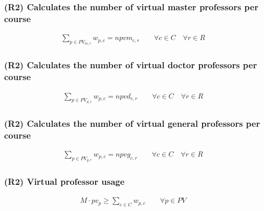 \subsubsection{(R2) Calculates the number of virtual master professors per course}
\begin{eqnarray}
\sum\limits_{p \in PV_{m,r}} w_{p,c} = npvm_{c,r} \nonumber \qquad 
\forall c \in C \quad
\forall r \in R
\end{eqnarray}

\subsubsection{(R2) Calculates the number of virtual doctor professors per course}
\begin{eqnarray}
\sum\limits_{p \in PV_{d,r}} w_{p,c} = npvd_{c,r} \nonumber \qquad 
\forall c \in C \quad
\forall r \in R
\end{eqnarray}

\subsubsection{(R2) Calculates the number of virtual general professors per course}
\begin{eqnarray}
\sum\limits_{p \in PV_{g,r}} w_{p,c} = npvg_{c,r} \nonumber \qquad 
\forall c \in C \quad
\forall r \in R
\end{eqnarray}
      
\subsubsection{(R2) Virtual professor usage}
\begin{eqnarray}
M \cdot pv_{p} \ge \sum\limits_{c \in C} w_{p,c} \nonumber \qquad 
\forall p \in PV
\end{eqnarray}


